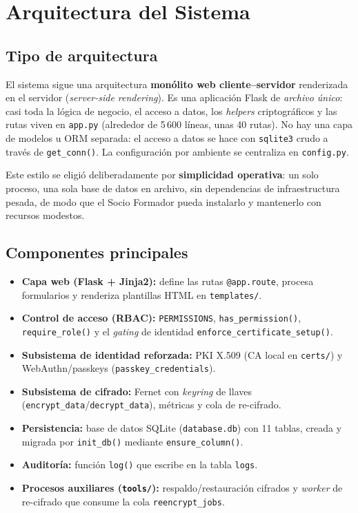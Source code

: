 \documentclass[10pt,letterpaper]{report}
\begin{document}
\chapter{Arquitectura del Sistema}

\section{Tipo de arquitectura}
El sistema sigue una arquitectura \textbf{mon\'olito web cliente--servidor} renderizada en el
servidor (\emph{server-side rendering}). Es una aplicaci\'on Flask de \emph{archivo \'unico}: casi
toda la l\'ogica de negocio, el acceso a datos, los \emph{helpers} criptogr\'aficos y las rutas
viven en \texttt{app.py} (alrededor de 5\,600 l\'ineas, unas 40 rutas). No hay una capa de modelos u
ORM separada: el acceso a datos se hace con \texttt{sqlite3} crudo a trav\'es de \texttt{get\_conn()}.
La configuraci\'on por ambiente se centraliza en \texttt{config.py}.

Este estilo se eligi\'o deliberadamente por \textbf{simplicidad operativa}: un solo proceso, una sola
base de datos en archivo, sin dependencias de infraestructura pesada, de modo que el Socio Formador
pueda instalarlo y mantenerlo con recursos modestos.

\section{Componentes principales}
\begin{itemize}
  \item \textbf{Capa web (Flask + Jinja2):} define las rutas \texttt{@app.route}, procesa formularios
  y renderiza plantillas HTML en \texttt{templates/}.
  \item \textbf{Control de acceso (RBAC):} \texttt{PERMISSIONS}, \texttt{has\_permission()},
  \texttt{require\_role()} y el \emph{gating} de identidad \texttt{enforce\_certificate\_setup()}.
  \item \textbf{Subsistema de identidad reforzada:} PKI X.509 (CA local en \texttt{certs/}) y
  WebAuthn/passkeys (\texttt{passkey\_credentials}).
  \item \textbf{Subsistema de cifrado:} Fernet con \emph{keyring} de llaves
  (\texttt{encrypt\_data}/\texttt{decrypt\_data}), m\'etricas y cola de re-cifrado.
  \item \textbf{Persistencia:} base de datos SQLite (\texttt{database.db}) con 11 tablas, creada y
  migrada por \texttt{init\_db()} mediante \texttt{ensure\_column()}.
  \item \textbf{Auditor\'ia:} funci\'on \texttt{log()} que escribe en la tabla \texttt{logs}.
  \item \textbf{Procesos auxiliares (\texttt{tools/}):} respaldo/restauraci\'on cifrados y
  \emph{worker} de re-cifrado que consume la cola \texttt{reencrypt\_jobs}.
\end{itemize}
\end{document}
